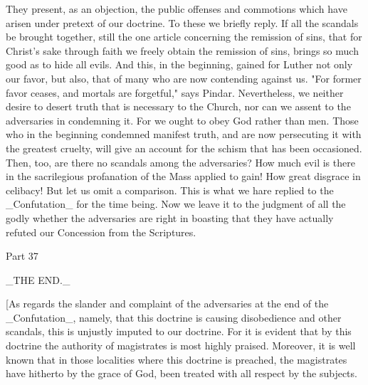 They present, as an objection, the public offenses and commotions
which have arisen under pretext of our doctrine.  To these we briefly
reply.  If all the scandals be brought together, still the one
article concerning the remission of sins, that for Christ's sake
through faith we freely obtain the remission of sins, brings so much
good as to hide all evils.  And this, in the beginning, gained for
Luther not only our favor, but also, that of many who are now
contending against us.  "For former favor ceases, and mortals are
forgetful," says Pindar.  Nevertheless, we neither desire to desert
truth that is necessary to the Church, nor can we assent to the
adversaries in condemning it.  For we ought to obey God rather than
men.  Those who in the beginning condemned manifest truth, and are
now persecuting it with the greatest cruelty, will give an account
for the schism that has been occasioned.  Then, too, are there no
scandals among the adversaries?  How much evil is there in the
sacrilegious profanation of the Mass applied to gain!  How great
disgrace in celibacy!  But let us omit a comparison.  This is what we
hare replied to the _Confutation_ for the time being.  Now we leave
it to the judgment of all the godly whether the adversaries are right
in boasting that they have actually refuted our Concession from the
Scriptures.




Part 37


_THE END._

[As regards the slander and complaint of the adversaries at the end
of the _Confutation_, namely, that this doctrine is causing
disobedience and other scandals, this is unjustly imputed to our
doctrine.  For it is evident that by this doctrine the authority of
magistrates is most highly praised.  Moreover, it is well known that
in those localities where this doctrine is preached, the magistrates
have hitherto by the grace of God, been treated with all respect by
the subjects.

